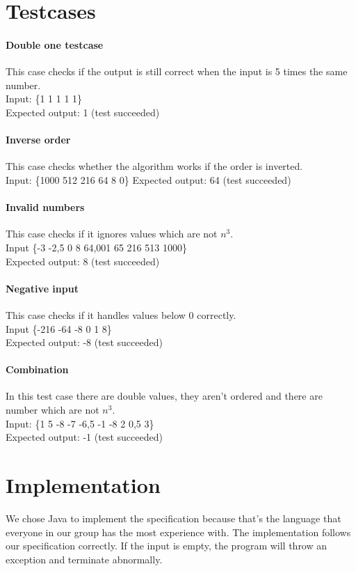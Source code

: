 \documentclass[12pt]{article}
\begin{document}
\section{Testcases}

\paragraph{Double one testcase}
This case checks if the output is still correct when the input is 5 times the same number. \\
Input: \{1 1 1 1 1\} \\
Expected output: 1 (test succeeded)

\paragraph{Inverse order}
This case checks whether the algorithm works if the order is inverted. \\
Input: \{1000 512 216 64 8 0\}
Expected output: 64 (test succeeded)

\paragraph{Invalid numbers}
This case checks if it ignores values which are not $n^3$. \\
Input \{-3 -2,5 0 8 64,001 65 216 513 1000\} \\
Expected output: 8 (test succeeded)

\paragraph{Negative input}
This case checks if it handles values below 0 correctly. \\
Input \{-216 -64 -8 0 1 8\} \\
Expected output: -8 (test succeeded)

\paragraph{Combination}
In this test case there are double values, they aren't ordered and there are number which are not $n^3$.\\
Input: \{1 5 -8 -7 -6,5 -1 -8 2 0,5 3\} \\
Expected output: -1 (test succeeded)

\section{Implementation}
We chose Java to implement the specification because that's the language that everyone in our group has the most experience with. The implementation follows our specification correctly. If the input is empty, the program will throw an exception and terminate abnormally.
\end{document}
